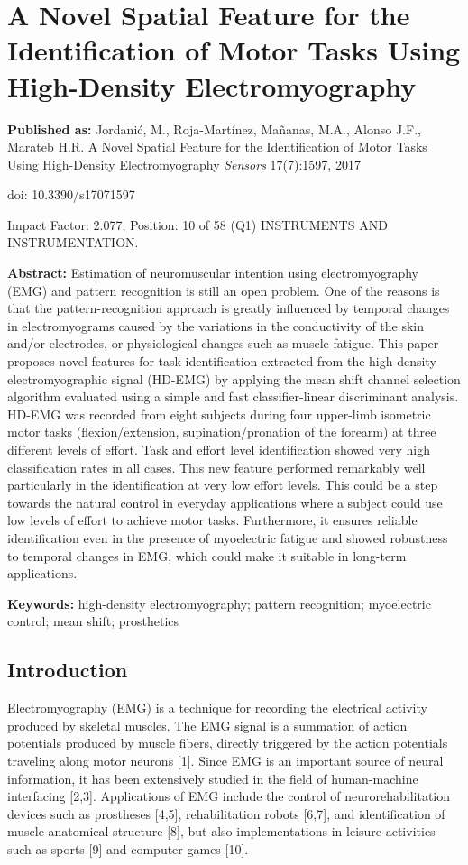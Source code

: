 \chapter{A Novel Spatial Feature for the Identification of Motor Tasks Using High-Density Electromyography}
\label{ch:4}
\textbf{Published as:} 
Jordanić, M., Roja-Martínez,  Ma\~nanas, M.A., Alonso J.F., Marateb H.R.
A Novel Spatial Feature for the Identification of Motor Tasks Using High-Density Electromyography 
\textit{Sensors} 17(7):1597, 2017

doi: 10.3390/s17071597

Impact Factor: 2.077; Position: 10 of 58 (Q1) INSTRUMENTS AND INSTRUMENTATION.


\textbf{Abstract:} Estimation of neuromuscular intention using electromyography (EMG) and pattern recognition is still an open problem. One of the reasons is that the pattern-recognition approach is greatly influenced by temporal changes in electromyograms caused by the variations in the conductivity of the skin and/or electrodes, or physiological changes such as muscle fatigue. This paper proposes novel features for task identification extracted from the high-density electromyographic signal (HD-EMG) by applying the mean shift channel selection algorithm evaluated using a simple and fast classifier-linear discriminant analysis. HD-EMG was recorded from eight subjects during four upper-limb isometric motor tasks (flexion/extension, supination/pronation of the forearm) at three different levels of effort. Task and effort level identification showed very high classification rates in all cases. This new feature performed remarkably well particularly in the identification at very low effort levels. This could be a step towards the natural control in everyday applications where a subject could use low levels of effort to achieve motor tasks. Furthermore, it ensures reliable identification even in the presence of myoelectric fatigue and showed robustness to temporal changes in EMG, which could make it suitable in long-term applications.

\textbf{Keywords:}  high-density electromyography; pattern recognition; myoelectric control; mean shift; prosthetics

\section{Introduction}

Electromyography (EMG) is a technique for recording the electrical activity produced by skeletal muscles. The EMG signal is a summation of action potentials produced by muscle fibers, directly triggered by the action potentials traveling along motor neurons [1]. Since EMG is an important source of neural information, it has been extensively studied in the field of human-machine interfacing [2,3]. Applications of EMG include the control of neurorehabilitation devices such as prostheses [4,5], rehabilitation robots [6,7], and identification of muscle anatomical structure [8], but also implementations in leisure activities such as sports [9] and computer games [10].


